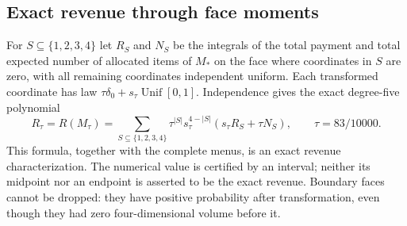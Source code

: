 \subsection{Exact revenue through face moments}
For $S\subseteq\{1,2,3,4\}$ let $R_S$ and $N_S$ be the integrals of
the total payment and total expected number of allocated items of $M_*$
on the face where coordinates in $S$ are zero, with all remaining
coordinates independent uniform. Each transformed coordinate has law
$\tau\delta_0+s_\tau\operatorname{Unif}[0,1]$. Independence gives the exact
degree-five polynomial
\begin{equation}\label{eq:v5-revenue}
 R_\tau=R(M_\tau)=
 \sum_{S\subseteq\{1,2,3,4\}}\tau^{|S|}s_\tau^{4-|S|}
                 (s_\tau R_S+\tau N_S),\qquad \tau=83/10000.
\end{equation}
This formula, together with the complete menus, is an exact revenue
characterization. The numerical value is certified by an interval;
neither its midpoint nor an endpoint is asserted to be the exact revenue.
Boundary faces cannot be dropped: they have positive probability after
transformation, even though they had zero four-dimensional volume before it.

